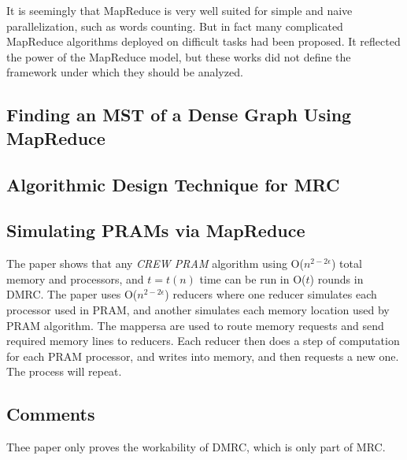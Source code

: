 \documentclass[]{report}
\begin{document}
		It is seemingly that MapReduce is very well suited for simple and naive parallelization, such as words counting. But in fact many complicated MapReduce algorithms deployed on difficult tasks had been proposed. It reflected the power of the MapReduce model, but these works did not define the framework under which they should be analyzed.
	\subsection*{Finding an MST of a Dense Graph Using MapReduce}
		
	\subsection*{Algorithmic Design Technique for MRC}
	
	\subsection*{Simulating PRAMs via MapReduce}
		The paper shows that any \textit{CREW PRAM} algorithm using O($n^{2-2\epsilon}$) total memory and processors, and $t=t(n)$ time can be run in O($t$) rounds in DMRC. The paper uses O($n^{2-2\epsilon}$) reducers where one reducer simulates each processor used in PRAM, and another simulates each memory location used by PRAM algorithm. The mappersa are used to route memory requests and send required memory lines to reducers. Each reducer then does a step of computation for each PRAM processor, and writes into memory, and then requests a new one. The process will repeat.
	
	\subsection*{Comments}
		Thee paper only proves the workability of DMRC, which is only part of MRC.
\end{document}
